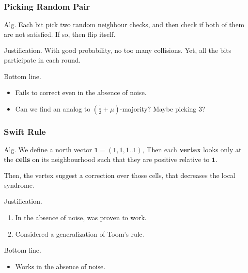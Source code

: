 \documentclass{beamer}
\begin{document}
\begin{frame}
\frametitle{Picking Random Pair}

\begin{block}{Alg.}
  Each bit pick two random neighbour checks, and then check if both of them are not satisfied. If so, then flip itself. 
\end{block}

\begin{block}{Justification.}
  With good probability, no too many collisions. Yet, all the bits participate in each round. 
\end{block}

\begin{block}{Bottom line.}
  \begin{itemize}
    \item Fails to correct even in the absence of noise. 
    \item Can we find an analog to $(\frac{1}{2} + \mu)$-majority? Maybe picking $3$? 
  \end{itemize}
\end{block}

\end{frame}
\begin{frame}
\frametitle{Swift Rule}

\begin{block}{Alg.}
  We define a north vector $\mathbf{1} = (1,1,1..1)$, Then each \textbf{vertex} looks only at the \textbf{cells} on its neighbourhood such that they are positive relative to $\mathbf{1}$.


  Then, the vertex suggest a correction over those cells, that decreases the local syndrome. 
\end{block}

\begin{block}{Justification.}
  \begin{enumerate}
    \item In the absence of noise, was proven to work. 
    \item Considered a generalization of Toom's rule.
  \end{enumerate}
\end{block}

\begin{block}{Bottom line.}
  \begin{itemize}
    \item Works in the absence of noise. 
  \end{itemize}
\end{block}

\end{frame}
\end{document}
